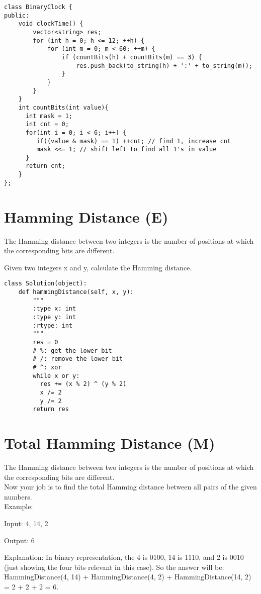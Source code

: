 \begin{lstlisting}
class BinaryClock {
public:
    void clockTime() {
        vector<string> res;
        for (int h = 0; h <= 12; ++h) {
            for (int m = 0; m < 60; ++m) {
                if (countBits(h) + countBits(m) == 3) {
                    res.push_back(to_string(h) + ':' + to_string(m));
                }
            }
        }
    }
    int countBits(int value){
      int mask = 1;
      int cnt = 0;
      for(int i = 0; i < 6; i++) {
         if((value & mask) == 1) ++cnt; // find 1, increase cnt
         mask <<= 1; // shift left to find all 1's in value
      }
      return cnt;       
    }
};
\end{lstlisting}

\section{Hamming Distance (E)}
The Hamming distance between two integers is the number of positions at which the corresponding bits are different.

Given two integers x and y, calculate the Hamming distance.

\begin{lstlisting}
class Solution(object):
    def hammingDistance(self, x, y):
        """
        :type x: int
        :type y: int
        :rtype: int
        """
        res = 0
        # %: get the lower bit
        # /: remove the lower bit
        # ^: xor
        while x or y:
          res += (x % 2) ^ (y % 2)
          x /= 2
          y /= 2
        return res       
\end{lstlisting}

\section{Total Hamming Distance (M)}
The Hamming distance between two integers is the number of positions at which the corresponding bits are different.\\

Now your job is to find the total Hamming distance between all pairs of the given numbers.\\

Example:

Input: 4, 14, 2

Output: 6

Explanation: In binary representation, the 4 is 0100, 14 is 1110, and 2 is 0010 (just
showing the four bits relevant in this case). So the answer will be:
HammingDistance(4, 14) + HammingDistance(4, 2) + HammingDistance(14, 2) = 2 + 2 + 2 = 6.\\

